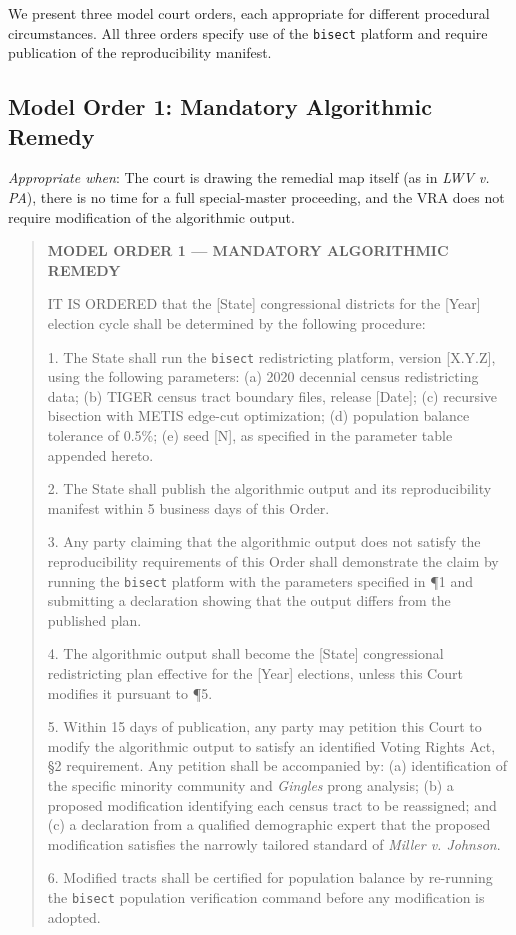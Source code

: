 We present three model court orders, each appropriate for different procedural circumstances. All three orders specify use of the \texttt{bisect} platform and require publication of the reproducibility manifest.

\subsection{Model Order 1: Mandatory Algorithmic Remedy}

\textit{Appropriate when}: The court is drawing the remedial map itself (as in \textit{LWV v. PA}), there is no time for a full special-master proceeding, and the VRA does not require modification of the algorithmic output.

\begin{quote}
\textbf{MODEL ORDER 1 --- MANDATORY ALGORITHMIC REMEDY}

IT IS ORDERED that the [State] congressional districts for the [Year] election cycle shall be determined by the following procedure:

1. The State shall run the \texttt{bisect} redistricting platform, version [X.Y.Z], using the following parameters: (a) 2020 decennial census redistricting data; (b) TIGER census tract boundary files, release [Date]; (c) recursive bisection with METIS edge-cut optimization; (d) population balance tolerance of 0.5\%; (e) seed [N], as specified in the parameter table appended hereto.

2. The State shall publish the algorithmic output and its reproducibility manifest within 5 business days of this Order.

3. Any party claiming that the algorithmic output does not satisfy the reproducibility requirements of this Order shall demonstrate the claim by running the \texttt{bisect} platform with the parameters specified in \P1 and submitting a declaration showing that the output differs from the published plan.

4. The algorithmic output shall become the [State] congressional redistricting plan effective for the [Year] elections, unless this Court modifies it pursuant to \P5.

5. Within 15 days of publication, any party may petition this Court to modify the algorithmic output to satisfy an identified Voting Rights Act, \S2 requirement. Any petition shall be accompanied by: (a) identification of the specific minority community and \textit{Gingles} prong analysis; (b) a proposed modification identifying each census tract to be reassigned; and (c) a declaration from a qualified demographic expert that the proposed modification satisfies the narrowly tailored standard of \textit{Miller v. Johnson}.

6. Modified tracts shall be certified for population balance by re-running the \texttt{bisect} population verification command before any modification is adopted.
\end{quote}

